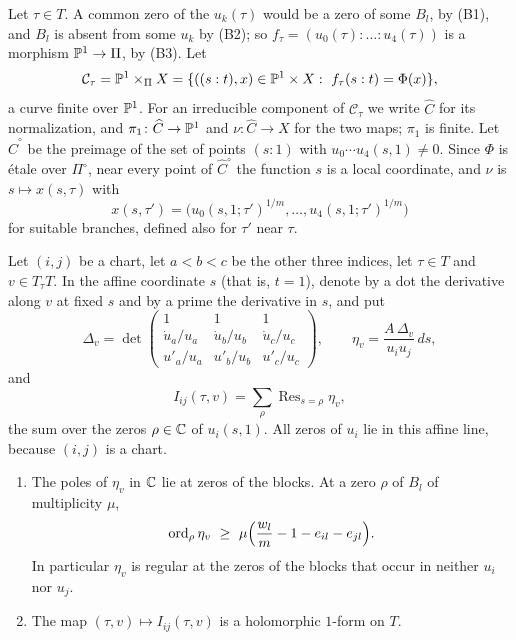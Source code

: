 Let $\tau\in T$. A common zero of the $u_{k}(\tau)$ would be a zero of some
$B_{l}$, by (B1), and $B_{l}$ is absent from some $u_{k}$ by (B2); so
$f_{\tau}=(u_{0}(\tau):\dots:u_{4}(\tau))$ is a morphism $\mathbb{P}^{1}\to\Pi$, by
(B3). Let
\[
  \mathcal C_{\tau}=\mathbb{P}^{1}\times_{\Pi}X=\{((s:t),x)\in\mathbb{P}^{1}\times X:\
  f_{\tau}(s:t)=\Phi(x)\},
\]
a curve finite over $\mathbb{P}^{1}$. For an irreducible component of
$\mathcal C_{\tau}$ we write $\widehat C$ for its normalization, and
$\pi_{1}\colon\widehat C\to\mathbb{P}^{1}$ and $\nu\colon\widehat C\to X$ for the two
maps; $\pi_{1}$ is finite. Let $\widehat C^{\circ}$ be the preimage of the
set of points $(s:1)$ with $u_{0}\cdots u_{4}(s,1)\ne0$. Since $\Phi$ is
\'etale over $\Pi^{\circ}$, near every point of $\widehat C^{\circ}$ the
function $s$ is a local coordinate, and $\nu$ is $s\mapsto x(s,\tau)$ with
\begin{equation}\label{eq:liftgen}
  x(s,\tau')=\bigl(u_{0}(s,1;\tau')^{1/m},\dots,u_{4}(s,1;\tau')^{1/m}\bigr)
\end{equation}
for suitable branches, defined also for $\tau'$ near $\tau$.

\begin{definition}\label{def:residuefunctional}
Let $(i,j)$ be a chart, let $a<b<c$ be the other three indices, let
$\tau\in T$ and $v\in T_{\tau}T$. In the affine coordinate $s$ (that is,
$t=1$), denote by a dot the derivative along $v$ at fixed $s$ and by a prime
the derivative in $s$, and put
\[
  \Delta_{v}=\det\begin{pmatrix}1&1&1\\ \dot u_{a}/u_{a}&\dot u_{b}/u_{b}&
  \dot u_{c}/u_{c}\\ u'_{a}/u_{a}&u'_{b}/u_{b}&u'_{c}/u_{c}\end{pmatrix},
  \qquad \eta_{v}=\frac{A\,\Delta_{v}}{u_{i}u_{j}}\,ds,
\]
and
\[
  I_{ij}(\tau,v)=\sum_{\rho}\operatorname{Res}_{s=\rho}\eta_{v},
\]
the sum over the zeros $\rho\in\mathbb{C}$ of $u_{i}(s,1)$. All zeros of $u_{i}$
lie in this affine line, because $(i,j)$ is a chart.
\end{definition}

\begin{lemma}\label{lem:etapoles}
\begin{enumerate}[label=\textup{(\alph*)}]
\item The poles of $\eta_{v}$ in $\mathbb{C}$ lie at zeros of the blocks. At a zero
$\rho$ of $B_{l}$ of multiplicity $\mu$,
\[
  \operatorname{ord}_{\rho}\eta_{v}\ \ge\ \mu\Bigl(\frac{w_{l}}{m}-1-e_{il}
  -e_{jl}\Bigr).
\]
In particular $\eta_{v}$ is regular at the zeros of the blocks that occur
in neither $u_{i}$ nor $u_{j}$.
\item The map $(\tau,v)\mapsto I_{ij}(\tau,v)$ is a holomorphic $1$-form on
$T$.
\end{enumerate}
\end{lemma}

